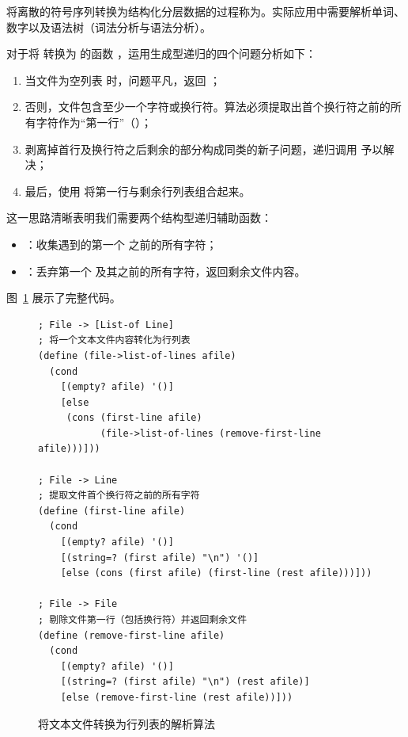将离散的符号序列转换为结构化分层数据的过程称为。实际应用中需要解析单词、数字以及语法树（词法分析与语法分析）。

对于将  转换为  的函数 ，运用生成型递归的四个问题分析如下：
\begin{enumerate}
  \item 当文件为空列表  时，问题平凡，返回 ；
  \item 否则，文件包含至少一个字符或换行符。算法必须提取出首个换行符之前的所有字符作为“第一行”（）；
  \item 剥离掉首行及换行符之后剩余的部分构成同类的新子问题，递归调用  予以解决；
  \item 最后，使用  将第一行与剩余行列表组合起来。
\end{enumerate}

这一思路清晰表明我们需要两个结构型递归辅助函数：
\begin{itemize}
  \item {}：收集遇到的第一个  之前的所有字符；
  \item {}：丢弃第一个  及其之前的所有字符，返回剩余文件内容。
\end{itemize}

图~\ref{fig:file-lines-code} 展示了完整代码。

\begin{figure}[htbp]
  \centering
\begin{lstlisting}[language=BSL]
; File -> [List-of Line]
; 将一个文本文件内容转化为行列表
(define (file->list-of-lines afile)
  (cond
    [(empty? afile) '()]
    [else
     (cons (first-line afile)
           (file->list-of-lines (remove-first-line afile)))]))

; File -> Line
; 提取文件首个换行符之前的所有字符
(define (first-line afile)
  (cond
    [(empty? afile) '()]
    [(string=? (first afile) "\n") '()]
    [else (cons (first afile) (first-line (rest afile)))]))

; File -> File
; 剔除文件第一行（包括换行符）并返回剩余文件
(define (remove-first-line afile)
  (cond
    [(empty? afile) '()]
    [(string=? (first afile) "\n") (rest afile)]
    [else (remove-first-line (rest afile))]))
\end{lstlisting}
  \caption{将文本文件转换为行列表的解析算法}
  \label{fig:file-lines-code}
\end{figure}

